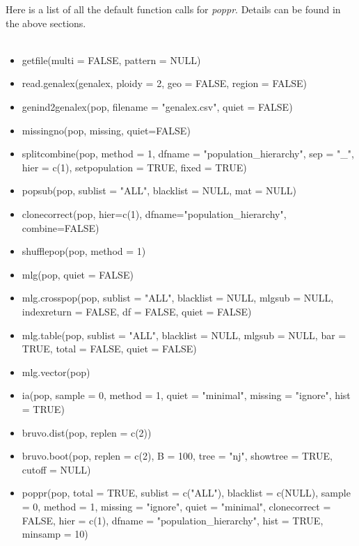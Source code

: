 \documentclass[letterpaper]{article}
\newcommand{\tab}{\hspace*{1em}}
\begin{document}
\tab\tab Here is a list of all the default function calls for \textit{poppr}. Details can be found in the above sections.\\
\tt
\begin{itemize}
\item getfile(multi = FALSE, pattern = NULL)
\item read.genalex(genalex, ploidy = 2, geo = FALSE, region = FALSE)
\item genind2genalex(pop, filename = "genalex.csv", quiet = FALSE)
\item missingno(pop, missing, quiet=FALSE)
\item splitcombine(pop, method = 1, dfname = "population\_hierarchy", sep = "\_", hier = c(1), setpopulation = TRUE, fixed = TRUE)
\item popsub(pop, sublist = "ALL", blacklist = NULL, mat = NULL)
\item clonecorrect(pop, hier=c(1), dfname="population\_hierarchy", combine=FALSE)
\item shufflepop(pop, method = 1)
\item mlg(pop, quiet = FALSE)
\item mlg.crosspop(pop, sublist = "ALL", blacklist = NULL, mlgsub = NULL, indexreturn = FALSE, df = FALSE, quiet = FALSE)
\item mlg.table(pop, sublist = "ALL", blacklist = NULL, mlgsub = NULL, bar = TRUE, total = FALSE, quiet = FALSE)
\item mlg.vector(pop)
\item ia(pop, sample = 0, method = 1, quiet = "minimal", missing = "ignore", hist = TRUE)
\item bruvo.dist(pop, replen = c(2))
\item bruvo.boot(pop, replen = c(2), B = 100, tree = "nj", showtree = TRUE, cutoff = NULL)
\item poppr(pop, total = TRUE, sublist = c("ALL"), blacklist = c(NULL), sample = 0, method = 1, missing = "ignore", quiet = "minimal", clonecorrect = FALSE, hier = c(1), dfname = "population\_hierarchy", hist = TRUE, minsamp = 10)
\end{itemize}


\end{document}
